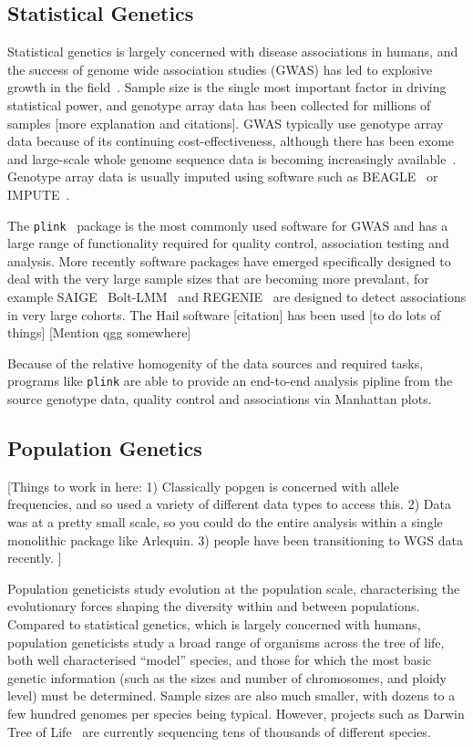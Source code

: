 \documentclass[a4paper,num-refs]{oup-contemporary}
\newcommand{\toolname}[1]{\texttt{#1}}
\begin{document}
\subsection{Statistical Genetics}
Statistical genetics is largely concerned with disease associations
in humans, and the success of genome wide association studies (GWAS) has led
to explosive growth in the field~\citep{uffelmann2021genome}.
Sample size is the single most
important factor in driving statistical power, and
genotype array data has been collected for millions of samples
[more explanation and citations].
GWAS typically use genotype array data because of
its continuing cost-effectiveness, although there has been
exome~\citep{lek2016analysis,backman2021exome}
and large-scale whole genome sequence data is becoming increasingly
available~\citep{halldorsson2022sequences}.
Genotype array data is usually imputed using software such
as BEAGLE~\citep{browning2018one} or IMPUTE~\citep{howie2011genotype}.

The \toolname{plink}~\citep{purcell2007plink} package is the most
commonly used software for GWAS and has a large range of functionality
required for quality control, association testing and analysis.
More recently software packages have emerged specifically designed
to deal with the very large sample sizes that are becoming
more prevalant, for example SAIGE~\citep{zhou2018efficiently}
Bolt-LMM~\citep{loh2015efficient}
and
REGENIE~\citep{mbatchou2021computationally} are designed to
detect associations in very large cohorts.
The Hail software [citation] has been used [to do lots of things]
[Mention qgg somewhere\citep{rohde2020qgg}]

Because of the relative homogenity of the data sources and
required tasks, programs like \toolname{plink} are able to provide
an end-to-end analysis pipline from the source genotype data, quality
control and associations via Manhattan plots.

\subsection{Population Genetics}
[Things to work in here:
1) Classically popgen is concerned with allele frequencies, and so
used a variety of different data types to access this.
2) Data was at a pretty small scale, so you could do the entire
analysis within a single monolithic package like Arlequin.
3) people have been transitioning to WGS data recently.
]

Population geneticists study evolution at the population scale,
characterising the evolutionary forces shaping the diversity
within and between populations. Compared to statistical genetics,
which is largely concerned with humans, population geneticists
study a broad range of organisms across the tree of life, both well
characterised ``model'' species, and those for which the most basic
genetic information (such as the sizes and number of chromosomes,
and ploidy level) must be determined.
Sample sizes are also much smaller,
with dozens to a few hundred genomes per species being typical.
However, projects such as Darwin Tree of
Life~\citep{darwin2022sequence} are currently sequencing tens of
thousands of different species.
\end{document}

